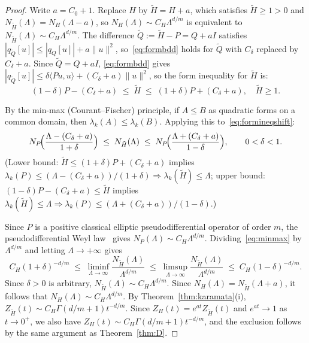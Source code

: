 \documentclass[12pt]{amsart}
\begin{document}
\begin{proof}
Write $a=C_0+1$.  Replace $H$ by $\tilde H=H+a$, which satisfies
$\tilde H\ge 1>0$ and $N_{\tilde H}(\Lambda)=N_H(\Lambda-a)$, so
$N_H(\Lambda)\sim C_H\Lambda^{d/m}$ is equivalent to
$N_{\tilde H}(\Lambda)\sim C_H\Lambda^{d/m}$.
The difference $\tilde Q:=\tilde H-P=Q+aI$ satisfies
$|q_{\tilde Q}[u]|\le|q_Q[u]|+a\|u\|^2$,
so~\eqref{eq:formbdd} holds for $\tilde Q$ with $C_\delta$ replaced by
$C_\delta+a$.  Since $\tilde Q=Q+aI$, \eqref{eq:formbdd} gives
$|q_{\tilde Q}[u]|\le\delta\langle Pu,u\rangle+(C_\delta+a)\|u\|^2$,
so the form inequality for $\tilde H$ is:
\begin{equation}
  \label{eq:formineqshift}
  (1-\delta)P-(C_\delta+a)\;\le\;\tilde H\;\le\;(1+\delta)P+(C_\delta+a),
  \quad \tilde H\ge 1.
\end{equation}

By the min-max (Courant--Fischer) principle, if $A\le B$ as quadratic
forms on a common domain, then $\lambda_k(A)\le\lambda_k(B)$.
Applying this to~\eqref{eq:formineqshift}:
\begin{equation}
  \label{eq:minmax}
  N_P\!\Bigl(\frac{\Lambda-(C_\delta+a)}{1+\delta}\Bigr)
  \;\le\;
  N_{\tilde H}(\Lambda)
  \;\le\;
  N_P\!\Bigl(\frac{\Lambda+(C_\delta+a)}{1-\delta}\Bigr),
  \qquad 0<\delta<1.
\end{equation}
(Lower bound: $\tilde H\le(1+\delta)P+(C_\delta+a)$ implies
$\lambda_k(P)\le(\Lambda-(C_\delta+a))/(1+\delta)\Rightarrow\lambda_k(\tilde H)\le\Lambda$;
upper bound: $(1-\delta)P-(C_\delta+a)\le\tilde H$ implies
$\lambda_k(\tilde H)\le\Lambda\Rightarrow\lambda_k(P)\le(\Lambda+(C_\delta+a))/(1-\delta)$.)

Since $P$ is a positive classical elliptic pseudodifferential operator
of order $m$, the pseudodifferential Weyl law~\cite{Hormander1968}
gives $N_P(\Lambda)\sim C_H\Lambda^{d/m}$.
Dividing~\eqref{eq:minmax} by $\Lambda^{d/m}$ and letting
$\Lambda\to+\infty$ gives
\[
  C_H(1+\delta)^{-d/m}
  \;\le\;\liminf_{\Lambda\to\infty}\frac{N_{\tilde H}(\Lambda)}{\Lambda^{d/m}}
  \;\le\;\limsup_{\Lambda\to\infty}\frac{N_{\tilde H}(\Lambda)}{\Lambda^{d/m}}
  \;\le\;C_H(1-\delta)^{-d/m}.
\]
Since $\delta>0$ is arbitrary, $N_{\tilde H}(\Lambda)\sim C_H\Lambda^{d/m}$.
Since $N_H(\Lambda)=N_{\tilde H}(\Lambda+a)$, it follows that
$N_H(\Lambda)\sim C_H\Lambda^{d/m}$.
By Theorem~\ref{thm:karamata}(i),
$Z_{\tilde H}(t)\sim C_H\Gamma(d/m+1)t^{-d/m}$.
Since $Z_H(t)=e^{at}Z_{\tilde H}(t)$ and $e^{at}\to 1$ as $t\to 0^+$,
we also have $Z_H(t)\sim C_H\Gamma(d/m+1)t^{-d/m}$,
and the exclusion follows by the same argument as Theorem~\ref{thm:D}.
\end{proof}
\end{document}
